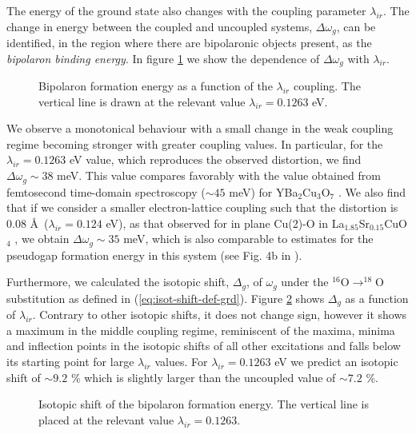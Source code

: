 The energy of the ground state also changes with the coupling parameter $\lambda_{ir}$.
The change in energy between the coupled and uncoupled systems, $\Delta\omega_{g}$, can be identified, in the region where there are bipolaronic objects present, as the \textit{bipolaron binding energy}.
In figure \ref{fig:polaronFormation} we show the dependence of $\Delta\omega_{g}$ with $\lambda_{ir}$.

\begin{figure}[ht]
  \centering
  
  \caption[Bipolaron formation energy as a function of the $\lambda_{ir}$ coupling. ]
  {Bipolaron formation energy as a function of the $\lambda_{ir}$ coupling. The vertical line is drawn at the relevant value $\lambda_{ir}=0.1263$ eV.}
  \label{fig:polaronFormation}
\end{figure}

We observe a monotonical behaviour with a small change in the weak coupling regime becoming stronger with greater coupling values.
In particular, for the $\lambda_{ir}=0.1263$ eV value, which reproduces the observed distortion, we find $\Delta\omega_{g} \sim 38$ meV.
This value compares favorably with the value obtained from femtosecond time-domain spectroscopy ($\sim 45$ meV) for YBa$_2$Cu$_3$O$_7$ \cite{Demsar1999}. 
We also find that if we consider a smaller electron-lattice coupling such that the distortion is 0.08 \AA\ ($\lambda_{ir}=0.124$ eV), as that observed for in plane Cu(2)-O in La$_{1.85}$Sr$_{0.15}$CuO$_4$ \cite{Bianconi1996}, we obtain $\Delta\omega_{g} \sim 35$ meV, which is also comparable to estimates for the pseudogap formation energy in this system (see Fig. 4b in \cite{Kusar2005}).

Furthermore, we calculated the isotopic shift, $\Delta_g$, of $\omega_g$ under the $^{16}$O$\rightarrow ^{18}$O substitution as defined in (\ref{eq:isot-shift-def-grd}).
Figure \ref{fig:isotPolaronFormation} shows $\Delta_g$ as a function of $\lambda_{ir}$.
Contrary to other isotopic shifts, it does not change sign, however it shows a maximum in the middle coupling regime, reminiscent of the maxima, minima and inflection points in the isotopic shifts of all other excitations and falls below its starting point for large $\lambda_{ir}$ values.
For $\lambda_{ir}=0.1263$ eV we predict an isotopic shift of $\sim 9.2$ \% which is slightly larger than the uncoupled value of $\sim 7.2$ \%.

\begin{figure}[ht]
  \centering
  
  \caption[Isotopic shift of the bipolaron formation energy.]
  {Isotopic shift of the bipolaron formation energy. The vertical line is placed at the relevant value $\lambda_{ir}=0.1263$.}
  \label{fig:isotPolaronFormation}
\end{figure}



